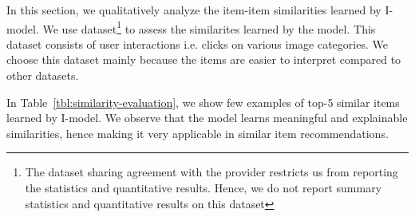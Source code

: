 In this section, we qualitatively analyze the item-item similarities learned by I-\LinearLow model. We use \Fotolia dataset\footnote{\scriptsize The dataset sharing agreement with the provider restricts us from reporting the statistics and quantitative results. Hence, we do not report summary statistics and quantitative results on this dataset} to assess the  similarites learned by the model. This dataset consists of user interactions i.e. clicks on various image categories.
We choose this dataset mainly because the items are easier to interpret compared to other datasets.

In Table~\ref{tbl:similarity-evaluation}, we show few examples of top-5 similar items learned by I-\LinearLow model. We observe that  the model learns meaningful and explainable similarities, hence making it very applicable in similar item recommendations.  
\begin{table*}

	\centering
	\caption{Top-5 similar items learned by I-\LinearLow model.}
	\label{tbl:similarity-evaluation}
	\setlength{\arrayrulewidth}{.2em}
\end{table*}




		
